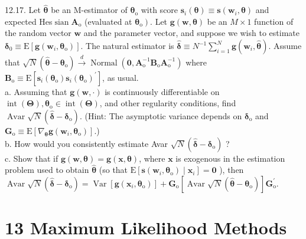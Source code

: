 \documentclass[10pt]{article}
\begin{document}
12.17. Let $\hat{\boldsymbol{\theta}}$ be an M-estimator of $\boldsymbol{\theta}_{\mathrm{o}}$ with score $\mathbf{s}_{i}(\boldsymbol{\theta}) \equiv \mathbf{s}\left(\mathbf{w}_{i}, \boldsymbol{\theta}\right)$ and expected Hes$\operatorname{sian} \mathbf{A}_{\mathrm{o}}$ (evaluated at $\left.\boldsymbol{\theta}_{\mathrm{o}}\right)$. Let $\mathbf{g}(\mathbf{w}, \boldsymbol{\theta})$ be an $M \times 1$ function of the random vector $\mathbf{w}$ and the parameter vector, and suppose we wish to estimate $\boldsymbol{\delta}_{0} \equiv \mathrm{E}\left[\mathbf{g}\left(\mathbf{w}_{i}, \boldsymbol{\theta}_{\mathrm{o}}\right)\right]$. The natural estimator is $\hat{\boldsymbol{\delta}} \equiv N^{-1} \sum_{i=1}^{N} \mathbf{g}\left(\mathbf{w}_{i}, \hat{\boldsymbol{\theta}}\right)$. Assume that $\sqrt{N}\left(\hat{\boldsymbol{\theta}}-\boldsymbol{\theta}_{\mathrm{o}}\right) \xrightarrow{d} \operatorname{Normal}\left(\mathbf{0}, \mathbf{A}_{\mathrm{o}}^{-1} \mathbf{B}_{\mathrm{o}} \mathbf{A}_{\mathrm{o}}^{-1}\right)$ where $\mathbf{B}_{\mathrm{o}} \equiv \mathrm{E}\left[\mathbf{s}_{i}\left(\boldsymbol{\theta}_{\mathrm{o}}\right) \mathbf{s}_{i}\left(\boldsymbol{\theta}_{\mathrm{o}}\right)^{\prime}\right]$, as usual.\\
a. Assuming that $\mathbf{g}(\mathbf{w}, \cdot)$ is continuously differentiable on $\operatorname{int}(\boldsymbol{\Theta}), \boldsymbol{\theta}_{\mathrm{o}} \in \operatorname{int}(\boldsymbol{\Theta})$, and other regularity conditions, find $\operatorname{Avar} \sqrt{N}\left(\hat{\boldsymbol{\delta}}-\boldsymbol{\delta}_{\mathrm{o}}\right)$. (Hint: The asymptotic variance depends on $\boldsymbol{\delta}_{\mathrm{o}}$ and $\mathbf{G}_{\mathrm{o}} \equiv \mathrm{E}\left[\nabla_{\boldsymbol{\theta}} \mathbf{g}\left(\mathbf{w}_{i}, \boldsymbol{\theta}_{\mathrm{o}}\right)\right]$.)\\
b. How would you consistently estimate Avar $\sqrt{N}\left(\hat{\boldsymbol{\delta}}-\boldsymbol{\delta}_{\mathrm{o}}\right)$ ?\\
c. Show that if $\boldsymbol{g}(\mathbf{w}, \boldsymbol{\theta})=\mathbf{g}(\mathbf{x}, \boldsymbol{\theta})$, where $\mathbf{x}$ is exogenous in the estimation problem used to obtain $\hat{\boldsymbol{\theta}}$ (so that $\mathrm{E}\left[\mathbf{s}\left(\mathbf{w}_{i}, \boldsymbol{\theta}_{\mathrm{o}}\right) \mid \mathbf{x}_{i}\right]=\mathbf{0}$ ), then $\operatorname{Avar} \sqrt{N}\left(\hat{\boldsymbol{\delta}}-\boldsymbol{\delta}_{\mathrm{o}}\right)= \operatorname{Var}\left[\mathbf{g}\left(\mathbf{x}_{i}, \boldsymbol{\theta}_{\mathrm{o}}\right)\right]+\mathbf{G}_{\mathrm{o}}\left[\operatorname{Avar} \sqrt{N}\left(\hat{\boldsymbol{\theta}}-\boldsymbol{\theta}_{\mathrm{o}}\right)\right] \mathbf{G}_{\mathrm{o}}^{\prime}$.

\section*{13 Maximum Likelihood Methods}
\end{document}
